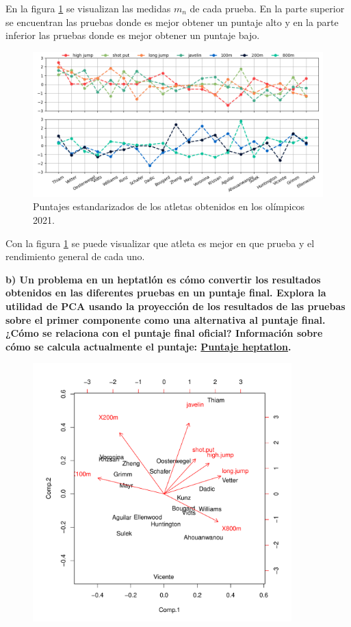 En la figura \ref{fig:estandar_points} se visualizan las medidas $m_n$ de cada prueba. En la parte superior se encuentran las pruebas donde es mejor obtener un puntaje alto y en la parte inferior las pruebas donde es mejor obtener un puntaje bajo.

\begin{figure}[H]
    \centering
    \includegraphics[width=16cm]{Graphics/heptatlon.png}
    \caption{Puntajes estandarizados de los atletas obtenidos en los olímpicos 2021.}
    \label{fig:estandar_points}
\end{figure}

Con la figura \ref{fig:estandar_points} se puede visualizar que atleta es mejor en que prueba y el rendimiento general de cada uno.

\textbf{b) Un problema en un heptatlón es cómo convertir los resultados obtenidos en las diferentes pruebas en un puntaje final. Explora la utilidad de PCA usando la proyección de los resultados de las pruebas sobre el primer componente como una alternativa al puntaje final. ¿Cómo se relaciona con el puntaje final oficial? Información sobre cómo se calcula actualmente el puntaje: \href{http://theaftermatter.blogspot.mx/2012/06/maths-of-heptathlon-why-scoring-system.html}{Puntaje heptatlon}.}

\begin{figure}[H]
    \centering
    \includegraphics[width=10cm]{Graphics/heptatlon_pca.png}
\end{figure}
